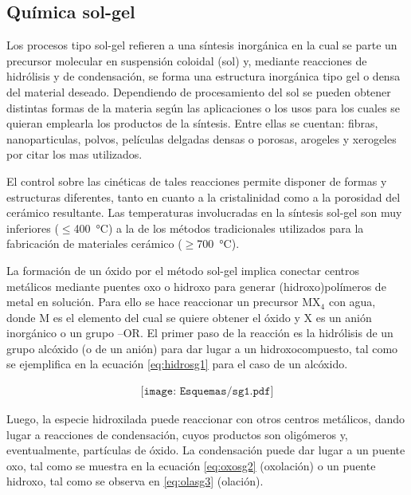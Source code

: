 	\subsection{Química sol-gel}

	Los procesos tipo sol-gel refieren a una síntesis inorgánica en la cual se parte un precursor molecular en suspensión coloidal (sol) y, mediante reacciones de hidrólisis y de condensación, se  forma una estructura inorgánica tipo gel o densa del material deseado. Dependiendo de procesamiento del sol se pueden obtener distintas formas de la materia según las aplicaciones o los usos para los cuales se quieran emplearla los productos de la síntesis. Entre ellas se cuentan: fibras, nanoparticulas, polvos, películas delgadas densas o porosas, arogeles y xerogeles por citar los mas utilizados.

	El control sobre las cinéticas de tales reacciones permite disponer de formas y estructuras diferentes, tanto en cuanto a la cristalinidad como a la porosidad del cerámico resultante. Las temperaturas involucradas en la síntesis sol-gel son muy inferiores ($\leq$\SI{400}{\celsius}) a la de los métodos tradicionales utilizados para la fabricación de materiales cerámico ($\geq$\SI{700}{\celsius}).\cite{Brinker1990,Jolivet2000,Wright2001}

	La formación de un óxido por el método sol-gel implica conectar centros metálicos mediante puentes oxo o hidroxo para generar (hidroxo)polímeros de metal en solución. Para ello se hace reaccionar un precursor MX$_4$ con agua, donde M es el elemento del cual se quiere obtener el óxido y X es un anión inorgánico o un grupo –OR. El primer paso de la reacción es la hidrólisis de un grupo alcóxido (o de un anión) para dar lugar a un hidroxocompuesto, tal como se ejemplifica en la ecuación \ref{eq:hidrosg1} para el caso de un alcóxido.
			
			 \begin{equation}
 				\begin{aligned}
 				\texttt{[image: Esquemas/sg1.pdf]}
 				\end{aligned}
 				\label{eq:hidrosg1}
 	 			\end{equation}

	Luego, la especie hidroxilada puede reaccionar con otros centros metálicos, dando lugar a reacciones de condensación, cuyos productos son oligómeros y, eventualmente, partículas de óxido. La condensación puede dar lugar a un puente oxo, tal como se muestra en la ecuación \ref{eq:oxosg2} (oxolación) o un puente hidroxo, tal como se observa en \ref{eq:olasg3} (olación). 


